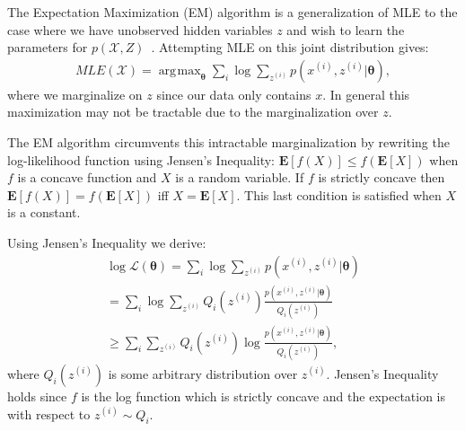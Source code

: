 \documentclass[11pt]{article}
\DeclareMathOperator*{\argmax}{\arg\!\max}
\begin{document}
The Expectation Maximization (EM) algorithm is a generalization of MLE to the case where we have unobserved hidden variables $z$ and wish to learn the parameters for $p(\mathcal{X}, Z)$~\cite{Ng}.  Attempting MLE on this joint distribution gives:
\begin{gather*}
MLE(\mathcal{X}) = \argmax_{\boldsymbol{\theta}} \sum_i \log  \sum_{z^{(i)}}  p(x^{(i)}, z^{(i)}|\boldsymbol{\theta}),
\end{gather*}
where we marginalize on $z$ since our data only contains $x$.  In general this maximization may not be tractable due to the marginalization over $z$.

The EM algorithm circumvents this intractable marginalization by rewriting the log-likelihood function using Jensen's Inequality: $\mathbf{E}[f(X)] \leq f(\mathbf{E}[X])$ when $f$ is a concave function and $X$ is a random variable.  If $f$ is strictly concave then $\mathbf{E}[f(X)] = f(\mathbf{E}[X])$ iff $X = \mathbf{E}[X]$.  This last condition is satisfied when $X$ is a constant. 

Using Jensen's Inequality we derive:
\begin{gather}
\log \mathcal{L}(\boldsymbol{\theta}) = \sum_i \log \sum_{z^{(i)}} p(x^{(i)}, z^{(i)}|\boldsymbol{\theta})\nonumber \\
= \sum_i \log \sum_{z^{(i)}} Q_i(z^{(i)}) \frac{p(x^{(i)}, z^{(i)}|\boldsymbol{\theta})}{Q_i(z^{(i)})} \nonumber \\
\geq \sum_i \sum_{z^{(i)}} Q_i(z^{(i)})  \log \frac{p(x^{(i)}, z^{(i)}|\boldsymbol{\theta})}{Q_i(z^{(i)})},
\end{gather}
where $Q_i(z^{(i)})$ is some arbitrary distribution over $z^{(i)}$.  Jensen's Inequality holds since $f$ is the log function which is strictly concave and the expectation is with respect to $z^{(i)} \sim Q_i$.
\end{document}
